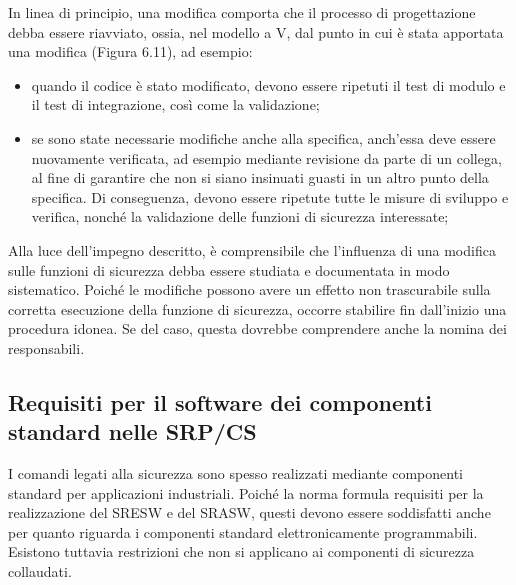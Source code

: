 In linea di principio, una modifica comporta che il processo di progettazione debba essere riavviato, ossia, nel modello a V, dal punto in cui è stata apportata una modifica (Figura 6.11), ad esempio:
\begin{itemize}
    \item quando il codice è stato modificato, devono essere ripetuti il test di modulo e il test di integrazione, così come la validazione;
    \item se sono state necessarie modifiche anche alla specifica, anch'essa deve essere nuovamente verificata, ad esempio mediante revisione da parte di un collega, al fine di garantire che non si siano insinuati guasti in un altro punto della specifica. Di conseguenza, devono essere ripetute tutte le misure di sviluppo e verifica, nonché la validazione delle funzioni di sicurezza interessate;
\end{itemize}

Alla luce dell'impegno descritto, è comprensibile che l'influenza di una modifica sulle funzioni di sicurezza debba essere studiata e documentata in modo sistematico. Poiché le modifiche possono avere un effetto non trascurabile sulla corretta esecuzione della funzione di sicurezza, occorre stabilire fin dall'inizio una procedura idonea. Se del caso, questa dovrebbe comprendere anche la nomina dei responsabili.

\subsection{Requisiti per il software dei componenti standard nelle SRP/CS}
\label{subsec:06-3-10}
I comandi legati alla sicurezza sono spesso realizzati mediante componenti standard per applicazioni industriali. Poiché la norma formula requisiti per la realizzazione del SRESW e del SRASW, questi devono essere soddisfatti anche per quanto riguarda i componenti standard elettronicamente programmabili. Esistono tuttavia restrizioni che non si applicano ai componenti di sicurezza collaudati.

